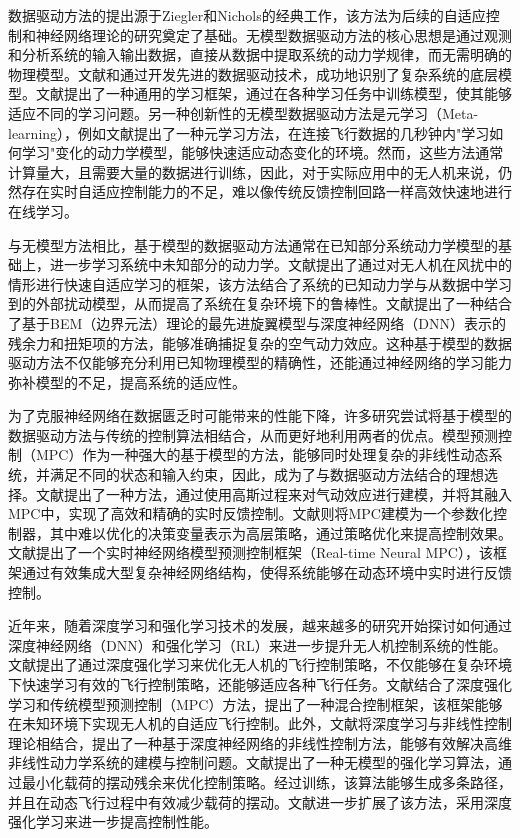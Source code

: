 \documentclass[lang=chs, degree=master, blindreview=false, winfonts=true]{yanputhesis}
\begin{document}
数据驱动方法的提出源于Ziegler和Nichols的经典工作\cite{ziegler1942optimum}，该方法为后续的自适应控制\cite{wittenmark1989adaptive}和神经网络理论\cite{werbos1989neural}的研究奠定了基础。无模型数据驱动方法的核心思想是通过观测和分析系统的输入输出数据，直接从数据中提取系统的动力学规律，而无需明确的物理模型。文献和通过开发先进的数据驱动技术，成功地识别了复杂系统的底层模型。文献提出了一种通用的学习框架，通过在各种学习任务中训练模型，使其能够适应不同的学习问题。另一种创新性的无模型数据驱动方法是元学习（Meta-learning），例如文献提出了一种元学习方法，在连接飞行数据的几秒钟内"学习如何学习"变化的动力学模型，能够快速适应动态变化的环境。然而，这些方法通常计算量大，且需要大量的数据进行训练，因此，对于实际应用中的无人机来说，仍然存在实时自适应控制能力的不足，难以像传统反馈控制回路一样高效快速地进行在线学习。

与无模型方法相比，基于模型的数据驱动方法通常在已知部分系统动力学模型的基础上，进一步学习系统中未知部分的动力学。文献提出了通过对无人机在风扰中的情形进行快速自适应学习的框架，该方法结合了系统的已知动力学与从数据中学习到的外部扰动模型，从而提高了系统在复杂环境下的鲁棒性。文献提出了一种结合了基于BEM（边界元法）理论的最先进旋翼模型与深度神经网络（DNN）表示的残余力和扭矩项的方法，能够准确捕捉复杂的空气动力效应。这种基于模型的数据驱动方法不仅能够充分利用已知物理模型的精确性，还能通过神经网络的学习能力弥补模型的不足，提高系统的适应性。

为了克服神经网络在数据匮乏时可能带来的性能下降，许多研究尝试将基于模型的数据驱动方法与传统的控制算法相结合，从而更好地利用两者的优点。模型预测控制（MPC）作为一种强大的基于模型的方法，能够同时处理复杂的非线性动态系统，并满足不同的状态和输入约束\cite{neunert2016fast}，因此，成为了与数据驱动方法结合的理想选择。文献提出了一种方法，通过使用高斯过程来对气动效应进行建模，并将其融入MPC中，实现了高效和精确的实时反馈控制。文献则将MPC建模为一个参数化控制器，其中难以优化的决策变量表示为高层策略，通过策略优化来提高控制效果。文献提出了一个实时神经网络模型预测控制框架（Real-time Neural MPC），该框架通过有效集成大型复杂神经网络结构，使得系统能够在动态环境中实时进行反馈控制。

近年来，随着深度学习和强化学习技术的发展，越来越多的研究开始探讨如何通过深度神经网络（DNN）和强化学习（RL）来进一步提升无人机控制系统的性能。文献提出了通过深度强化学习来优化无人机的飞行控制策略，不仅能够在复杂环境下快速学习有效的飞行控制策略，还能够适应各种飞行任务。文献结合了深度强化学习和传统模型预测控制（MPC）方法，提出了一种混合控制框架，该框架能够在未知环境下实现无人机的自适应飞行控制。此外，文献将深度学习与非线性控制理论相结合，提出了一种基于深度神经网络的非线性控制方法，能够有效解决高维非线性动力学系统的建模与控制问题。文献提出了一种无模型的强化学习算法，通过最小化载荷的摆动残余来优化控制策略。经过训练，该算法能够生成多条路径，并且在动态飞行过程中有效减少载荷的摆动。文献进一步扩展了该方法，采用深度强化学习来进一步提高控制性能。
\end{document}
